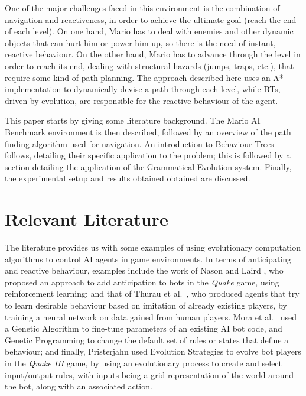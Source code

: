 \documentclass[conference]{IEEEtran}
\begin{document}
One of the major challenges faced in this environment is the
combination of navigation and reactiveness, in order to achieve the ultimate
goal (reach the end of each level). On one hand, Mario has to deal with
enemies and other dynamic objects that can hurt him or power him up, so there
is the need of instant, reactive behaviour. On the other hand, Mario has to
advance through the level in order to reach its end, dealing with structural
hazards (jumps, traps, etc.), that require some kind of path planning.
The approach described here uses an A* implementation to dynamically
devise a path through each level, while BTs, driven by evolution, are
responsible for the reactive behaviour of the agent.

This paper starts by giving some literature background. The Mario AI Benchmark
environment is then described, followed by an overview of the path finding
algorithm used for navigation. An introduction to Behaviour Trees follows, detailing
their specific application to the problem; this is followed by a section
detailing the application of the Grammatical Evolution system.
Finally, the experimental setup and results obtained obtained are discussed.

\section{Relevant Literature}

The literature provides us with some examples of using evolutionary
computation algorithms to control AI agents in game environments. In terms 
of anticipating and reactive behaviour, examples include the work of Nason and
Laird \cite{NL04}, who proposed an approach to add anticipation to bots in the
\textit{Quake} game, using reinforcement learning; and that of Thurau et
al.~\cite{TBS04}, who produced agents that try to learn desirable behaviour
based on imitation of already existing players, by training a neural network on data
gained from human players. Mora et al.~\cite{MMM10} used a Genetic Algorithm 
to fine-tune parameters of an existing AI bot code, and Genetic Programming to 
change the default set of rules or states that define a behaviour; and finally, 
Pristerjahn\cite{Pri09} used Evolution Strategies to evolve bot players in the 
\textit{Quake III} game, by using an evolutionary process to create and select 
input/output rules, with inputs being a grid representation of the world 
around the bot, along with an associated action.
\end{document}
